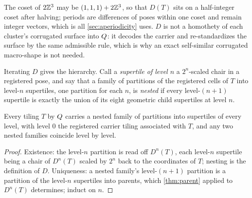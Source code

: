 The coset of $2\mathbb{Z}^3$ may be $(1,1,1)+2\mathbb{Z}^3$, so that $D(T)$ sits on a half-integer coset after
halving; periods are differences of poses within one coset and remain integer vectors, which
is all \cref{sec:aperiodicity} uses. $D$ is not a homothety of each cluster's corrugated surface
into $Q$: it decodes the carrier and re-standardizes the surface by the same admissible
rule, which is why an exact self-similar corrugated macro-shape is not needed.

Iterating $D$ gives the hierarchy. Call a \emph{supertile of level $n$} a $2^n$-scaled chair in
a registered pose, and say that a family of partitions of the registered cells of $T$ into
level-$n$ supertiles, one partition for each $n$, is \emph{nested} if every level-$(n+1)$
supertile is exactly the union of its eight geometric child supertiles at level $n$.

\begin{theorem}\label{thm:hierarchy}
Every tiling $T$ by $Q$ carries a nested family of partitions into supertiles of every level,
with level $0$ the registered carrier tiling associated with $T$, and any two nested families
coincide level by level.
\end{theorem}

\begin{proof}
Existence: the level-$n$ partition is read off $D^n(T)$, each level-$n$ supertile being a chair
of $D^n(T)$ scaled by $2^n$ back to the coordinates of $T$; nesting is the definition of $D$.
Uniqueness: a nested family's level-$(n+1)$ partition is a partition of the level-$n$ supertiles
into parents, which \cref{thm:parent} applied to $D^n(T)$ determines; induct on $n$.
\end{proof}

